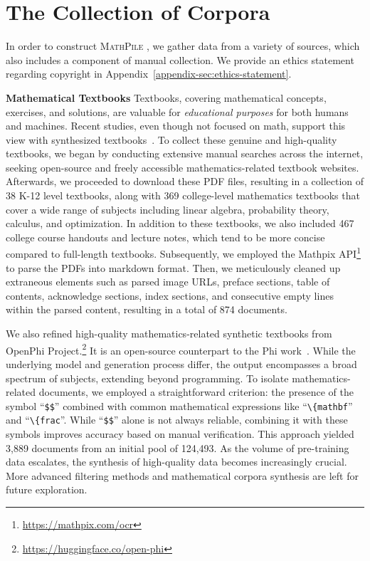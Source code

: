 \section{The Collection of Corpora}
\label{sec:data-collection}

In order to construct {\textsc{MathPile }}, we gather data from a variety of sources, which also includes a component of manual collection. We provide an ethics statement regarding copyright in Appendix~\ref{appendix-sec:ethics-statement}.

\textbf{Mathematical Textbooks} \quad Textbooks, covering mathematical concepts, exercises, and solutions, are valuable for \textit{educational purposes} for both humans and machines. Recent studies, even though not focused on math, support this view with synthesized textbooks~\citep{DBLP:journals/corr/abs-2306-11644-textbooks-are-all-you-need,DBLP:journals/corr/abs-2309-05463-phi-1.5}. To collect these genuine and high-quality textbooks, we began by conducting extensive manual searches across the internet, seeking open-source and freely accessible mathematics-related textbook websites. Afterwards, we proceeded to download these PDF files, resulting in a collection of 38 K-12 level textbooks, along with 369 college-level mathematics textbooks that cover a wide range of subjects including linear algebra, probability theory, calculus, and optimization. In addition to these textbooks, we also included  467 college course handouts and lecture notes, which tend to be more concise compared to full-length textbooks. Subsequently, we employed the Mathpix API\footnote{\url{https://mathpix.com/ocr}} to parse the PDFs into markdown format. Then, we meticulously cleaned up extraneous elements such as parsed image URLs, preface sections, table of contents, acknowledge sections, index sections, and consecutive empty lines within the parsed content, resulting in a  total of 874 documents.

We also refined high-quality mathematics-related synthetic textbooks from OpenPhi Project.\footnote{\url{https://huggingface.co/open-phi}} It is an open-source counterpart to the Phi work~\citep{DBLP:journals/corr/abs-2306-11644-textbooks-are-all-you-need}. While the underlying model and generation process differ, the output encompasses a broad spectrum of subjects, extending beyond programming. To isolate mathematics-related documents, we employed a straightforward criterion: the presence of the symbol ``\texttt{\$\$}'' combined with common mathematical expressions like ``\verb|\|\texttt{\{mathbf}'' and  ``\verb|\|\texttt{\{frac}''.  While ``\texttt{\$\$}'' alone is not always reliable, combining it with these symbols improves accuracy based on manual verification. This approach yielded 3,889 documents from an initial pool of 124,493. As the volume of pre-training data escalates, the synthesis of high-quality data becomes increasingly crucial. More advanced filtering methods and mathematical corpora synthesis are left for future exploration.

